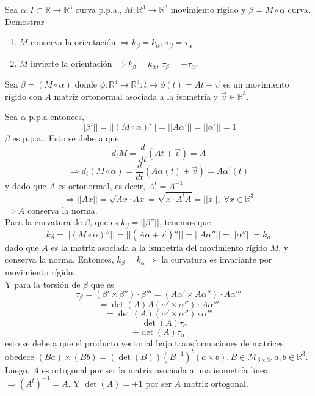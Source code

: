 
\begin{ejr}[35]
  Sea $\alpha  : I \subset \mathbb{R} \to \mathbb{R}^{3}$ curva p.p.a., $M: \mathbb{R}^3 \to \mathbb{R}^3$ movimiento rígido y $\beta = M \circ \alpha$ curva. Demostrar
  \begin{enumerate}[label=(\roman*)]
    \item $M$ conserva la orientación $\Rightarrow k_{\beta} = k_{\alpha}$, $\tau_{\beta} = \tau_{\alpha}$,
    \item $M$ invierte la orientación $\Rightarrow k_{\beta} = k_{\alpha}$, $\tau_{\beta} = - \tau_{\alpha}$.
  \end{enumerate}
\end{ejr}

\begin{sol}[35]
  Sea $\beta = (M  \circ \alpha)$ donde $\phi: \mathbb{R}^3 \to \mathbb{R}^3 : t \mapsto \phi(t) = At + \vec{v}$ es un movimiento rígido con $A$ matriz ortonormal asociada a la isometría y $\vec{v} \in \mathbb{R}^3$.
  
  Sea $\alpha$ p.p.a entonces,
  \[ 
    ||\beta'|| = ||(M \circ \alpha )'|| = ||A \alpha'|| = ||\alpha'|| = 1
  \] 
  $\beta$ es p.p.a.. Esto se debe a que
  \[ 
    d_{t} M = \frac{d{}}{d{t}} (At + \vec{v}) = A
  \]
  \[ 
    \Rightarrow d_{t} (M \circ \alpha) = \frac{d{}}{d{t}}(A \alpha(t) + \vec{v}) = A \alpha'(t)
  \] 
  y dado que $A$ es ortonormal, es decir, $A^{t} = A^{-1}$
  \[
    \Rightarrow ||A x|| = \sqrt{ Ax \cdot Ax } = \sqrt{ x \cdot A^{t}A } = ||x||, \; \forall x \in \mathbb{R}^{3}
  \]
  $\Rightarrow A$ conserva la norma. \\


  Para la curvatura de $\beta$, que es $k_{\beta} = ||\beta''||$, tenemos que
  \[ 
    k_{\beta} = ||(M \circ \alpha)''|| = ||(A \alpha + \vec{v})''|| = ||A \alpha''|| = ||\alpha''|| =  k_{\alpha}
  \]
  dado que $A$ es la matriz asociada a la ismoetría del movimiento rígido $M$, y conserva la norma. Entonces, $k_{\beta} = k_{\alpha} \Rightarrow$ la curvatura es invariante por movimiento rígido.  \\

  Y para la torsión de $\beta$ que es
  \[ 
   \tau_{\beta} = (\beta ' \times \beta '') \cdot \beta''' = (A \alpha' \times A \alpha'') \cdot A \alpha'''
  \] 
  \[ 
    = \det(A) A (\alpha' \times \alpha'') \cdot A \alpha'''
  \] 
  \[ 
    = \det(A) (\alpha' \times \alpha'') \cdot \alpha'''
  \] 
  \[ 
    = \det(A) \tau_{\alpha}
  \] 
  \[ 
    \pm \det(A) \tau_{\alpha} 
  \] 
  esto se debe a que el producto vectorial bajo transformaciones de matrices obedece $(Ba) \times (Bb) = (\det(B))(B^{-1})^t (a \times b), B \in \mathcal{M}_{3 \times 3}, a, b \in \mathbb{R}^{3}$. Luego,  $A$ es ortogonal por ser la matriz asociada a una isometría linea $\Rightarrow (A^{t})^{-1} = A$. Y $\det(A) = \pm 1$ por ser $A$ matriz ortogonal.\\


\end{sol}
